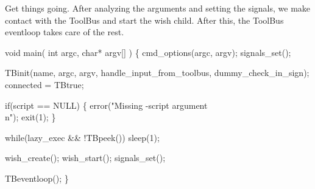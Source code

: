 
Get things going. After analyzing the arguments and setting the signals,
we make contact with the ToolBus and start the wish child.
After this, the ToolBus eventloop takes care of the rest.

\nwenddocs{}\endmoddef\let\nwnotused=\nwoutput{}
void main( int argc, char* argv[] )
\{
   cmd_options(argc, argv);
   signals_set();
   
   TBinit(name, argc, argv, handle_input_from_toolbus, dummy_check_in_sign);
   connected = TBtrue;

   if(script == NULL) \{
      error("Missing -script argument\\n");
      exit(1);
   \}

   while(lazy_exec && !TBpeek())
      sleep(1);

   wish_create();
   wish_start();
   signals_set();
   
   TBeventloop();
\}
\nwendcode{}

